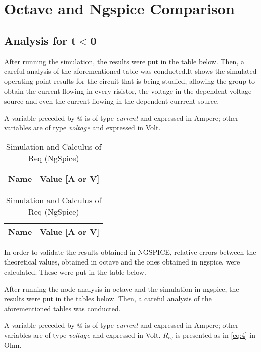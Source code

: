 \section{Octave and Ngspice Comparison} \label{section:comp}

\subsection{Analysis for t$<$0}

After running the simulation, the results were put in the table below. Then, a careful analysis of the aforementioned table was conducted.It shows the simulated operating point results for the circuit that is being studied, allowing the group to obtain the current flowing in every risistor, the voltage in the dependent voltage source and even the current flowing in the dependent currrent source. 

A variable preceded by @ is of type {\em current} and expressed in Ampere; other variables are of type {\it voltage} and expressed in
    Volt.
\begin{table}[ht]
\parbox{.45\linewidth}{
  \centering
  \begin{tabular}{|l|r|}
    \hline    
    {\bf Name} & {\bf Value [A or V]} \\ \hline
    
  \end{tabular}
  \caption{Simulation and Calculus of Req (NgSpice)}} 
\parbox{.45\linewidth}{
  \centering
  \begin{tabular}{|l|r|}
    \hline    
    {\bf Name} & {\bf Value [A or V]} \\ \hline
    
  \end{tabular}
  \caption{Simulation and Calculus of Req (NgSpice)}}
 
\end{table}


In order to validate the results obtained in NGSPICE, relative errors between the theoretical values, obtained in octave and the ones obtained in ngspice, were calculated. These were put in the table below.



After running the node analysis in octave and the simulation in ngspice, the results were put in the tables below. Then, a careful analysis of the aforementioned tables was conducted.

A variable preceded by @ is of type {\em current} and expressed in Ampere; other variables are of type {\it voltage} and expressed in
    Volt. $R_{eq}$ is presented as in \ref{eq:4} in Ohm.

